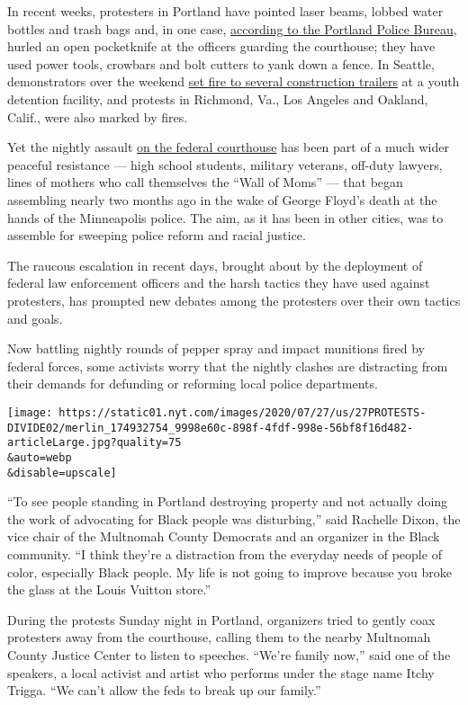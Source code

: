 In recent weeks, protesters in Portland have pointed laser beams, lobbed
water bottles and trash bags and, in one case,
\href{https://www.portlandoregon.gov/police/news/read.cfm?id=250945}{according
to the Portland Police Bureau}, hurled an open pocketknife at the
officers guarding the courthouse; they have used power tools, crowbars
and bolt cutters to yank down a fence. In Seattle, demonstrators over
the weekend
\href{https://www.nytimes.com/2020/07/25/us/protests-seattle-portland.html}{set
fire to several construction trailers} at a youth detention facility,
and protests in Richmond, Va., Los Angeles and Oakland, Calif., were
also marked by fires.

Yet the nightly assault
\href{https://www.nytimes.com/2020/07/22/us/portland-protests-courthouse.html}{on
the federal courthouse} has been part of a much wider peaceful
resistance --- high school students, military veterans, off-duty
lawyers, lines of mothers who call themselves the ``Wall of Moms'' ---
that began assembling nearly two months ago in the wake of George
Floyd's death at the hands of the Minneapolis police. The aim, as it has
been in other cities, was to assemble for sweeping police reform and
racial justice.

The raucous escalation in recent days, brought about by the deployment
of federal law enforcement officers and the harsh tactics they have used
against protesters, has prompted new debates among the protesters over
their own tactics and goals.

Now battling nightly rounds of pepper spray and impact munitions fired
by federal forces, some activists worry that the nightly clashes are
distracting from their demands for defunding or reforming local police
departments.

\texttt{[image: https://static01.nyt.com/images/2020/07/27/us/27PROTESTS-DIVIDE02/merlin\_174932754\_9998e60c-898f-4fdf-998e-56bf8f16d482-articleLarge.jpg?quality=75\\\&auto=webp\\\&disable=upscale]}

``To see people standing in Portland destroying property and not
actually doing the work of advocating for Black people was disturbing,''
said Rachelle Dixon, the vice chair of the Multnomah County Democrats
and an organizer in the Black community. ``I think they're a distraction
from the everyday needs of people of color, especially Black people. My
life is not going to improve because you broke the glass at the Louis
Vuitton store.''

During the protests Sunday night in Portland, organizers tried to gently
coax protesters away from the courthouse, calling them to the nearby
Multnomah County Justice Center to listen to speeches. ``We're family
now,'' said one of the speakers, a local activist and artist who
performs under the stage name Itchy Trigga. ``We can't allow the feds to
break up our family.''

